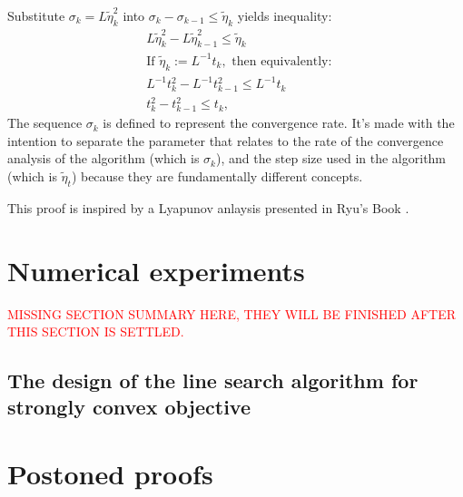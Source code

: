 \documentclass[12pt]{article}
\begin{document}
    \begin{observation}
        Substitute $\sigma_k = L \tilde \eta_k^2$ into $\sigma_k - \sigma_{k - 1} \le \tilde \eta_k$ yields inequality:
        \begin{align*}
            & L \tilde \eta_k^2 - L \tilde \eta_{k - 1}^2 
            \le 
            \tilde \eta_k
            \\
            & \text{If }  \tilde \eta_k := L^{-1} t_k, \text{ then equivalently: }
            \\
            & L^{-1}t_k^2 - L^{-1}t_{k - 1}^2
            \le L^{-1}t_k 
            \\
            & 
            t_k^2 - t_{k - 1}^2
            \le t_k, 
        \end{align*}
        The sequence $\sigma_k$ is defined to represent the convergence rate. 
        It's made with the intention to separate the parameter that relates to the rate of the convergence analysis of the algorithm (which is $\sigma_k$), and the step size used in the algorithm (which is $\tilde \eta_t$) because they are fundamentally different concepts. 
    \end{observation}
    \begin{remark}
        This proof is inspired by a Lyapunov anlaysis presented in Ryu's Book \cite[Chapter 12]{ryu_large-scale_2022}. 
    \end{remark}

\section{Numerical experiments}\label{sec:numerical-experiments}
    \textcolor{red}{MISSING SECTION SUMMARY HERE, THEY WILL BE FINISHED AFTER THIS SECTION IS SETTLED.}
    \subsection{The design of the line search algorithm for strongly convex objective}









\appendix
\section{Postoned proofs}
\end{document}
